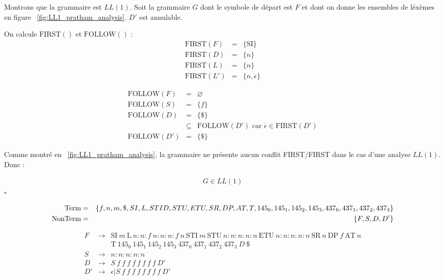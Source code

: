 \documentclass[twocolumn,pre,floats,aps,amsmath,amssymb]{revtex4}
\newenvironment{proof}[1][D\'emonstration.]{\begin{trivlist}
\item[\hskip \labelsep {\bfseries #1}]}{\end{trivlist}}
\begin{document}
\begin{proof}
Montrons que la grammaire est $LL(1)$. Soit la grammaire $G$ dont le symbole de d\'epart est $F$ et dont on donne les ensembles de l\'ex\`emes en figure ~\ref{fig:LL1_pratham_analysis}. $D'$ est annulable.
  
On calcule $\text{FIRST}()$ et $\text{FOLLOW}()$ :
\begin{eqnarray*}
  \text{FIRST} (F)  &=& \{ \text{SI} \}\\
  \text{FIRST} (D)  &=& \{ n \}\\
  \text{FIRST} (L)  &=& \{ n \}\\
  \text{FIRST} (L') &=& \{ n, \dot{\epsilon} \}
\end{eqnarray*}
  
\begin{eqnarray*}
  \text{FOLLOW} (F) &=& \varnothing\\
  \text{FOLLOW} (S) &=& \{ f \}\\
  \text{FOLLOW} (D) &=& \{ \$ \}\\
  &\subseteq& \text{FOLLOW} (D') \text{ car } \dot{\epsilon} \in \text{FIRST} (D')\\
  \text{FOLLOW} (D') &=& \{ \$ \}
\end{eqnarray*}

Comme montr\'e en ~\ref{fig:LL1_pratham_analysis}, la grammaire ne pr\'esente aucun conflit FIRST/FIRST dans le cas d'une analyse $LL(1)$. Donc :

\begin{eqnarray*}
  G \in LL(1) 
\end{eqnarray*}
\hfill $\square$

\begin{figure}
\begin{eqnarray*}
  \textup{Term} &=& \{ f, n, m, \$, SI, L, STID, STU, ETU, SR, DP, AT, T, 145_0, 145_1, 145_2, 145_3, 437_0, 437_1, 437_2, 437_3 \}\\
  \textup{NonTerm} &=& \{ F, S, D, D' \}
\end{eqnarray*}

\begin{eqnarray*}
  F  &\rightarrow& \text{SI} \ m \ \text{L} \ n : n : f \ n : n : n : f \ n \ \text{STI} \ m \ \text{STU} \ n : n : n : n : n  \ \text{ETU} \ n : n : n : n : n \  \text{SR} \ n \ \text{DP} \ f \ \text{AT} \ n\\
  && \text{T} \ 145_0 \  145_1 \  145_2 \  145_3 \ 437_0 \ 437_1 \ 437_2 \ 437_3 \ D \ \$ \\
  S &\rightarrow& n : n : n : n : n\\
  D  &\rightarrow& S \ f \ f \ f \ f \ f \ f \ f \ f  \ D'\\
  D' &\rightarrow& \epsilon | S \ f \ f \ f \ f \ f \ f \ f \ f \ D'
  \end{eqnarray*}



\end{figure}
\end{proof}
\end{document}
